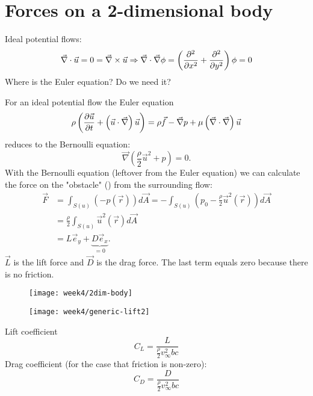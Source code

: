 \section{Forces on a 2-dimensional body}
\begin{framed}
Ideal potential flows:
\begin{equation}
\vec{\nabla}\cdot\vec{u}=0=\vec{\nabla}\times\vec{u}\Rightarrow\vec{\nabla}\cdot\vec{\nabla}\phi = \left(\frac{\partial^2 }{\partial x^2}+\frac{\partial^2 }{\partial y^2}\right)\phi=0
\end{equation}
Where is the Euler equation? Do we need it?
\end{framed}
For an ideal potential flow the Euler equation
\begin{equation}
\rho \left(\frac{\partial \vec{u}}{\partial t}+\left(\vec{u}\cdot\vec{\nabla}\right)\vec{u}\right) = \rho \vec{f} - \vec{\nabla}p + \mu\left(\vec{\nabla}\cdot\vec{\nabla}\right)\vec{u}
\end{equation}
reduces to the Bernoulli equation:
\begin{equation}
\vec{\nabla}\left(\frac{\rho}{2}\vec{u}^2+p\right)=0.
\end{equation}
With the Bernoulli equation (leftover from the Euler equation) we can calculate the force on the "obstacle" () from the surrounding flow:
\begin{align}
\vec{F} &= \int_{S(u)}(-p(\vec{r}))d\vec{A} = -\int_{S(u)}\left(p_0-\frac{\rho}{2}\vec{u}^2(\vec{r})\right)d\vec{A} \\
&= \frac{\rho}{2}\int_{S(u)}\vec{u}^2(\vec{r})d\vec{A}\\
&= L\vec{e}_y +\underbrace{D\vec{e}_x}_{=0}.
\end{align}
$\vec{L}$ is the lift force and $\vec{D}$ is the drag force. The last term equals zero because there is no friction.

\begin{figure}[!h]
    \centering
    \texttt{[image: week4/2dim-body]}\\
    \caption{}
    \label{fig:2dim-body}
\end{figure}

\begin{figure}[!h]
    \centering
    \texttt{[image: week4/generic-lift2]}\\
    \caption{}
    \label{fig:generic-lift2}
\end{figure}

Lift coefficient
\begin{equation}
C_L = \frac{L}{\frac{\rho}{2}v_\infty^2 b c}
\end{equation}
Drag coefficient (for the case that friction is non-zero):
\begin{equation}
C_D = \frac{D}{\frac{\rho}{2}v_\infty^2 b c}
\end{equation}


